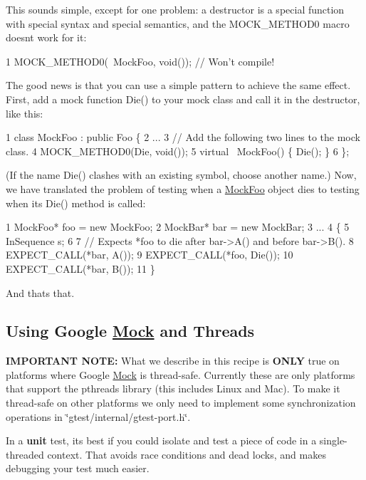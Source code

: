 This sounds simple, except for one problem\+: a destructor is a special function with special syntax and special semantics, and the {\ttfamily M\+O\+C\+K\+\_\+\+M\+E\+T\+H\+O\+D0} macro doesn\textquotesingle{}t work for it\+:


\begin{DoxyCode}
1 MOCK\_METHOD0(~MockFoo, void());  // Won't compile!
\end{DoxyCode}


The good news is that you can use a simple pattern to achieve the same effect. First, add a mock function {\ttfamily Die()} to your mock class and call it in the destructor, like this\+:


\begin{DoxyCode}
1 class MockFoo : public Foo \{
2   ...
3   // Add the following two lines to the mock class.
4   MOCK\_METHOD0(Die, void());
5   virtual ~MockFoo() \{ Die(); \}
6 \};
\end{DoxyCode}


(If the name {\ttfamily Die()} clashes with an existing symbol, choose another name.) Now, we have translated the problem of testing when a {\ttfamily \hyperlink{classMockFoo}{Mock\+Foo}} object dies to testing when its {\ttfamily Die()} method is called\+:


\begin{DoxyCode}
1 MockFoo* foo = new MockFoo;
2 MockBar* bar = new MockBar;
3 ...
4 \{
5   InSequence s;
6 
7   // Expects *foo to die after bar->A() and before bar->B().
8   EXPECT\_CALL(*bar, A());
9   EXPECT\_CALL(*foo, Die());
10   EXPECT\_CALL(*bar, B());
11 \}
\end{DoxyCode}


And that\textquotesingle{}s that.

\subsection*{Using Google \hyperlink{classMock}{Mock} and Threads}

{\bfseries I\+M\+P\+O\+R\+T\+A\+NT N\+O\+TE\+:} What we describe in this recipe is {\bfseries O\+N\+LY} true on platforms where Google \hyperlink{classMock}{Mock} is thread-\/safe. Currently these are only platforms that support the pthreads library (this includes Linux and Mac). To make it thread-\/safe on other platforms we only need to implement some synchronization operations in {\ttfamily \char`\"{}gtest/internal/gtest-\/port.\+h\char`\"{}}.

In a {\bfseries unit} test, it\textquotesingle{}s best if you could isolate and test a piece of code in a single-\/threaded context. That avoids race conditions and dead locks, and makes debugging your test much easier.

